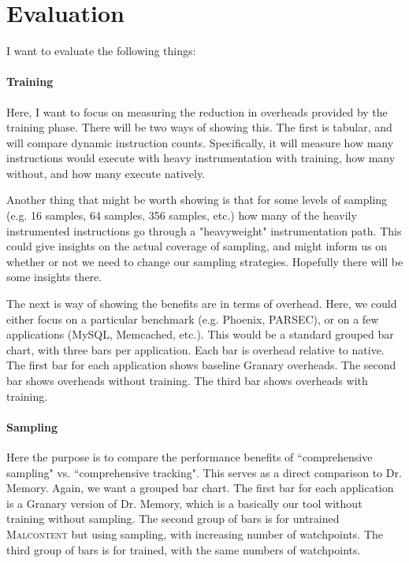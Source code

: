\documentclass[letterpaper,twocolumn,10pt]{article}
\newcommand{\TextToolname}{Malcontent}
\newcommand{\Toolname}{\textsc{\TextToolname{}}}
\begin{document}
\section{Evaluation}\label{sec:evaluation}
I want to evaluate the following things:

\paragraph{Training} Here, I want to focus on measuring the reduction in overheads provided by the training phase. There will
be two ways of showing this. The first is tabular, and will compare dynamic instruction counts. Specifically, it will measure how
many instructions would execute with heavy instrumentation with training, how many without, and how many execute natively.

Another thing that might be worth showing is that for some levels of sampling (e.g. 16 samples, 64 samples, 356 samples, etc.) how
many of the heavily instrumented instructions go through a "heavyweight" instrumentation path. This could give insights on
the actual coverage of sampling, and might inform us on whether or not we need to change our sampling strategies. Hopefully
there will be some insights there.

The next is way of showing the benefits are in terms of overhead. Here, we could either focus on a particular benchmark (e.g.
Phoenix, PARSEC), or on a few applications (MySQL, Memcached, etc.). This would be a standard grouped bar chart, with three
bars per application. Each bar is overhead relative to native. The first bar for each application shows baseline Granary overheads.
The second bar shows overheads without training. The third bar shows overheads with training.

\paragraph{Sampling}
Here the purpose is to compare the performance benefits of ``comprehensive sampling" vs. ``comprehensive tracking". This serves
as a direct comparison to Dr. Memory. Again, we want a grouped bar chart. The first bar for each application is a Granary version
of Dr. Memory, which is a basically our tool without training without sampling. The second group of bars is for untrained \Toolname{}
but using sampling, with increasing number of watchpoints. The third group of bars is for trained, with the same numbers of watchpoints.
\end{document}
